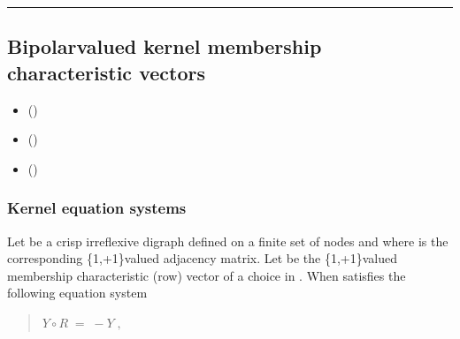 \documentclass[a4paper,12pt,english]{sphinxhowto}
\begin{document}
\bigskip\hrule\bigskip



\subsection{Bipolar\sphinxhyphen{}valued kernel membership characteristic vectors}
\label{\detokenize{pearls:bipolar-valued-kernel-membership-characteristic-vectors}}\label{\detokenize{pearls:bipolar-valued-kernels-tutorial-label}}
\begin{sphinxcontents}
\begin{itemize}
\item {} 
\sphinxAtStartPar
{}\label{\detokenize{pearls:id159}}{\hyperref[\detokenize{pearls:kernel-equation-systems}]{}} ()

\item {} 
\sphinxAtStartPar
{}\label{\detokenize{pearls:id160}}{\hyperref[\detokenize{pearls:solving-bipolar-valued-kernel-equation-systems}]{}} ()

\item {} 
\sphinxAtStartPar
{}\label{\detokenize{pearls:id161}}{\hyperref[\detokenize{pearls:historical-notes}]{}} ()

\end{itemize}
\end{sphinxcontents}


\subsubsection{Kernel equation systems}
\label{\detokenize{pearls:kernel-equation-systems}}
\sphinxAtStartPar
Let  be a crisp irreflexive digraph defined on a finite set  of nodes and where  is the corresponding \{\sphinxhyphen{}1,+1\}\sphinxhyphen{}valued adjacency matrix. Let  be the \{\sphinxhyphen{}1,+1\}\sphinxhyphen{}valued membership characteristic (row) vector of a choice in . When  satisfies the following equation system
\begin{quote}

\sphinxAtStartPar
\(Y \circ R \; = \; -Y\;,\)
\end{quote}
\end{document}
